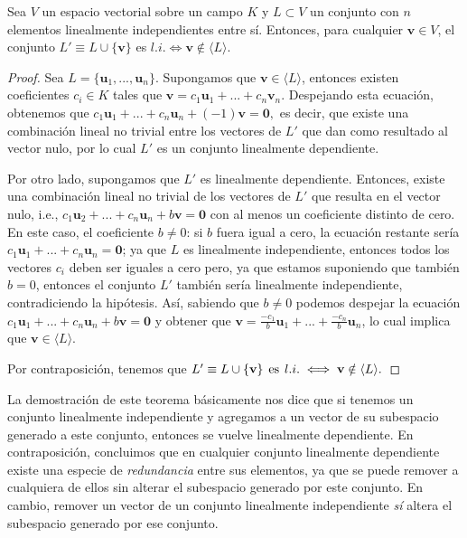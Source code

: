 \documentclass[12pt]{article}
\newenvironment{teorema}[2][Teorema]{\begin{trivlist}
\item[\hskip \labelsep {\bfseries #1}\hskip \labelsep {\bfseries #2.}]}{\end{trivlist}}
\begin{document}
\begin{teorema} {3.3.3.3}

Sea $V$ un espacio vectorial sobre un campo $K$ y $L\subset V$ un conjunto con $n$ elementos linealmente independientes entre sí. Entonces, para cualquier $\mathbf{v}\in V$, el conjunto $L'\equiv L\cup \{\mathbf{v}\}$ es $l.i. \iff \mathbf{v}\notin \langle L \rangle$.

\begin{proof}
Sea $L=\{\mathbf{u}_1, ... , \mathbf{u}_n\}.$ Supongamos que $\mathbf{v}\in\langle L \rangle$, entonces existen coeficientes $c_i\in K$ tales que $\mathbf{v}=c_1\mathbf{u}_1+...+c_n\mathbf{v}_n.$ Despejando esta ecuación, obtenemos que $c_1\mathbf{u}_1+...+c_n\mathbf{u}_n+(-1)\mathbf{v}=\mathbf{0},$ es decir, que existe una combinación lineal no trivial entre los vectores de $L'$ que dan como resultado al vector nulo, por lo cual $L'$ es un conjunto linealmente dependiente.

Por otro lado, supongamos que $L'$ es linealmente dependiente. Entonces, existe una combinación lineal no trivial de los vectores de $L'$ que resulta en el vector nulo, i.e., $c_1\mathbf{u}_2+...+c_n\mathbf{u}_n+b\mathbf{v}=\mathbf{0}$ con al menos un coeficiente distinto de cero. En este caso, el coeficiente $b\neq 0$: si $b$ fuera igual a cero, la ecuación restante sería $c_1\mathbf{u}_1+...+c_n\mathbf{u}_n=\mathbf{0}$; ya que $L$ es linealmente independiente, entonces todos los vectores $c_i$ deben ser iguales a cero pero, ya que estamos suponiendo que también $b=0$, entonces el conjunto $L'$ también sería linealmente independiente, contradiciendo la hipótesis. Así, sabiendo que $b\neq 0$ podemos despejar la ecuación $c_1\mathbf{u}_1+...+c_n\mathbf{u}_n+b\mathbf{v}=\mathbf{0}$ y obtener que $\mathbf{v}=\frac{-c_1}{b}\mathbf{u}_1+...+\frac{-c_n}{b}\mathbf{u}_n$, lo cual implica que $\mathbf{v}\in\langle L \rangle.$

    Por contraposición, tenemos que $L'\equiv L\cup\{\mathbf{v}\}\hspace{1.5mm}\text{es}\hspace{1.5mm} l.i.\iff \mathbf{v}\notin \langle L \rangle.$

\end{proof}

    La demostración de este teorema básicamente nos dice que si tenemos un conjunto linealmente independiente y agregamos a un vector de su subespacio generado a este conjunto, entonces se vuelve linealmente dependiente. En contraposición, concluimos que en cualquier conjunto linealmente dependiente existe una especie de \emph{redundancia} entre sus elementos, ya que se puede remover a cualquiera de ellos sin alterar el subespacio generado por este conjunto. En cambio, remover un vector de un conjunto linealmente independiente \emph{sí} altera el subespacio generado por ese conjunto.
\end{teorema}
\end{document}
